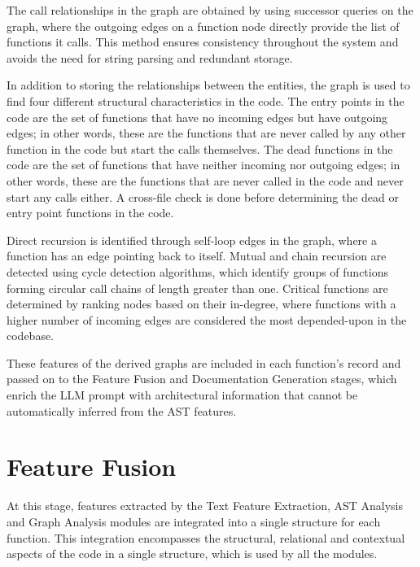 \par The call relationships in the graph are obtained by using successor queries on the graph, where the outgoing edges on a function node directly provide the list of functions it calls. This method ensures consistency throughout the system and avoids the need for string parsing and redundant storage.

\par In addition to storing the relationships between the entities, the graph is used to find four different structural characteristics in the code. The entry points in the code are the set of functions that have no incoming edges but have outgoing edges; in other words, these are the functions that are never called by any other function in the code but start the calls themselves. The dead functions in the code are the set of functions that have neither incoming nor outgoing edges; in other words, these are the functions that are never called in the code and never start any calls either. A cross-file check is done before determining the dead or entry point functions in the code.

\par Direct recursion is identified through self-loop edges in the graph, where a function has an edge pointing back to itself. Mutual and chain recursion are detected using cycle detection algorithms, which identify groups of functions forming circular call chains of length greater than one. Critical functions are determined by ranking nodes based on their in-degree, where functions with a higher number of incoming edges are considered the most depended-upon in the codebase.
\par These features of the derived graphs are included in each function’s record and passed on to the Feature Fusion and Documentation Generation stages, which enrich the LLM prompt with architectural information that cannot be automatically inferred from the AST features.

\section{Feature Fusion}
\hspace{0.5cm}
At this stage, features extracted by the Text Feature Extraction, AST Analysis and Graph Analysis modules are integrated into a single structure for each function. This integration encompasses the structural, relational and contextual aspects of the code in a single structure, which is used by all the modules.


